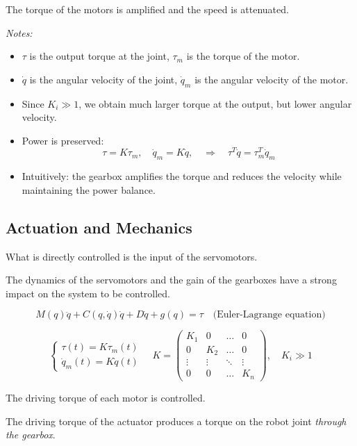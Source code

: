 The torque of the motors is amplified and the speed is attenuated.  

\textit{Notes:}  
\begin{itemize}
    \item $\tau$ is the output torque at the joint, $\tau_m$ is the torque of the motor.  
    \item $\dot{q}$ is the angular velocity of the joint, $\dot{q}_m$ is the angular velocity of the motor.  
    \item Since $K_i \gg 1$, we obtain much larger torque at the output, but lower angular velocity.  
    \item Power is preserved:  
    \[
    \tau = K \tau_m, \quad \dot{q}_m = K \dot{q}, \quad \Rightarrow \quad \tau^T \dot{q} = \tau_m^T \dot{q}_m
    \]  
    \item Intuitively: the gearbox amplifies the torque and reduces the velocity while maintaining the power balance.  
\end{itemize}

\hfill

\subsection{Actuation and Mechanics}

What is directly controlled is the input of the servomotors.  

The dynamics of the servomotors and the gain of the gearboxes have a strong impact on the system to be controlled.  

\[
M(q)\ddot{q} + C(q,\dot{q})\dot{q} + D\dot{q} + g(q) = \tau
\quad \text{(Euler-Lagrange equation)}
\]

\[
\begin{cases}
\tau(t) = K \tau_m(t) \\
\dot{q}_m(t) = K \dot{q}(t)
\end{cases}
\quad
K = 
\begin{pmatrix}
K_1 & 0   & \dots & 0 \\
0   & K_2 & \dots & 0 \\
\vdots & \vdots & \ddots & \vdots \\
0   & 0   & \dots & K_n
\end{pmatrix}, 
\quad K_i \gg 1
\]

The driving torque of each motor is controlled.  

The driving torque of the actuator produces a torque on the robot joint \textit{through the gearbox}.

